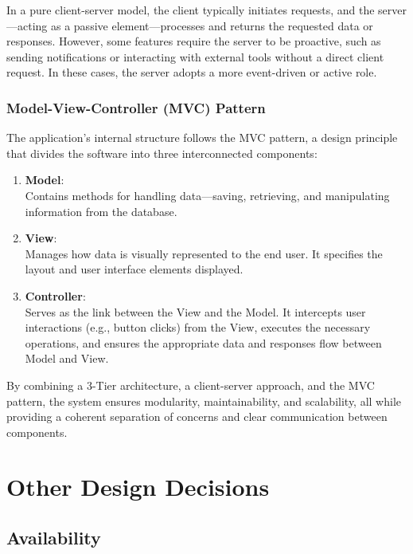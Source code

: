 In a pure client-server model, the client typically initiates requests, and the server—acting as a passive element—processes and returns the requested data or responses. However, some features require the server to be proactive, such as sending notifications or interacting with external tools without a direct client request. In these cases, the server adopts a more event-driven or active role.

\subsubsection*{Model-View-Controller (MVC) Pattern}

The application’s internal structure follows the MVC pattern, a design principle that divides the software into three interconnected components:

\begin{enumerate}
    \item \textbf{Model}:\\
    Contains methods for handling data—saving, retrieving, and manipulating information from the database.
    
    \item \textbf{View}:\\
    Manages how data is visually represented to the end user. It specifies the layout and user interface elements displayed.
    
    \item \textbf{Controller}:\\
    Serves as the link between the View and the Model. It intercepts user interactions (e.g., button clicks) from the View, executes the necessary operations, and ensures the appropriate data and responses flow between Model and View.
\end{enumerate}

By combining a 3-Tier architecture, a client-server approach, and the MVC pattern, the system ensures modularity, maintainability, and scalability, all while providing a coherent separation of concerns and clear communication between components.


\newpage
\section{Other Design Decisions}

\subsection{Availability}

